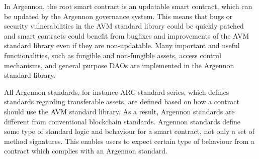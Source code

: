 In Argennon, the root smart contract is an updatable smart contract, which can be updated by the Argennon governance
system. This means that bugs or security vulnerabilities in the AVM standard library could be quickly patched and
smart contracts could benefit from bugfixes and improvements of the AVM standard library even if they are
non-updatable. Many important and useful functionalities,
such as fungible and non-fungible assets, access control mechanisms,
and general purpose DAOs are implemented in the Argennon standard library.

All Argennon standards, for instance ARC standard series, which defines standards regarding transferable assets,
are defined based on how a contract should use the AVM standard library. As a result, Argennon standards are
different from conventional blockchain standards. Argennon standards define some type of standard logic and
behaviour for a smart contract, not only a set of method signatures. This enables users to expect certain type
of behaviour from a contract which complies with an Argennon standard.
